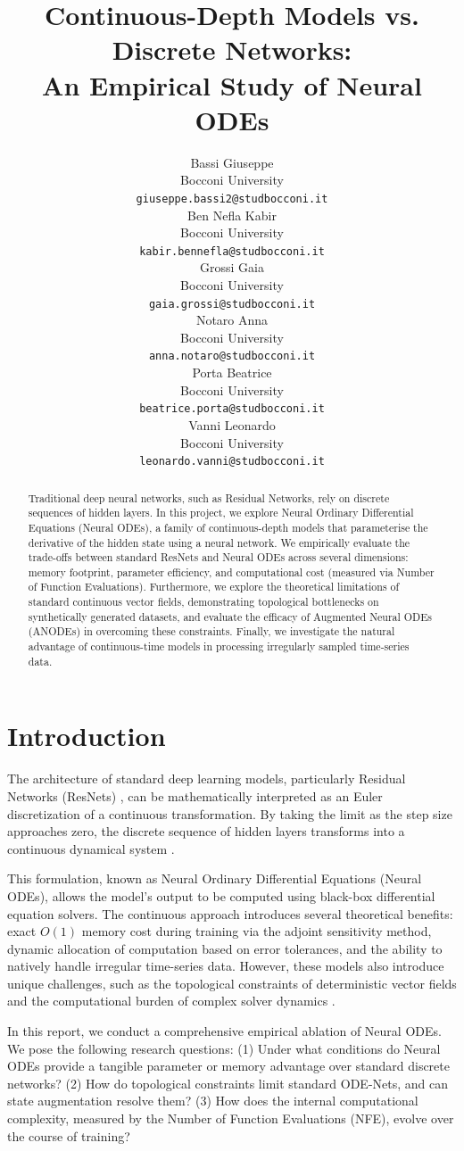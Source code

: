\documentclass{article}
\title{Continuous-Depth Models vs. Discrete Networks: \\ An Empirical Study of Neural ODEs}
\author{
  Bassi Giuseppe \\
  Bocconi University \\
  \texttt{giuseppe.bassi2@studbocconi.it} \\
  \And
  Ben Nefla Kabir \\
  Bocconi University \\
  \texttt{kabir.bennefla@studbocconi.it} \\
  \And
  Grossi Gaia \\
  Bocconi University \\
  \texttt{gaia.grossi@studbocconi.it} \\
  \AND
  Notaro Anna \\
  Bocconi University \\
  \texttt{anna.notaro@studbocconi.it} \\
  \And
  Porta Beatrice \\
  Bocconi University \\
  \texttt{beatrice.porta@studbocconi.it} \\
  \And
  Vanni Leonardo \\
Bocconi University \\
  \texttt{leonardo.vanni@studbocconi.it} \\
}
\begin{document}
\maketitle

\begin{abstract}
Traditional deep neural networks, such as Residual Networks, rely on discrete sequences of hidden layers. In this project, we explore Neural Ordinary Differential Equations (Neural ODEs), a family of continuous-depth models that parameterise the derivative of the hidden state using a neural network. We empirically evaluate the trade-offs between standard ResNets and Neural ODEs across several dimensions: memory footprint, parameter efficiency, and computational cost (measured via Number of Function Evaluations). Furthermore, we explore the theoretical limitations of standard continuous vector fields, demonstrating topological bottlenecks on synthetically generated datasets, and evaluate the efficacy of Augmented Neural ODEs (ANODEs) in overcoming these constraints. Finally, we investigate the natural advantage of continuous-time models in processing irregularly sampled time-series data. 
\end{abstract}

\section{Introduction}

The architecture of standard deep learning models, particularly Residual Networks (ResNets) \cite{he2016deep}, can be mathematically interpreted as an Euler discretization of a continuous transformation. By taking the limit as the step size approaches zero, the discrete sequence of hidden layers transforms into a continuous dynamical system \cite{chen2018neural}. 

This formulation, known as Neural Ordinary Differential Equations (Neural ODEs), allows the model's output to be computed using black-box differential equation solvers. The continuous approach introduces several theoretical benefits: exact $O(1)$ memory cost during training via the adjoint sensitivity method, dynamic allocation of computation based on error tolerances, and the ability to natively handle irregular time-series data. However, these models also introduce unique challenges, such as the topological constraints of deterministic vector fields and the computational burden of complex solver dynamics \cite{dupont2019augmented}. 

In this report, we conduct a comprehensive empirical ablation of Neural ODEs. We pose the following research questions: (1) Under what conditions do Neural ODEs provide a tangible parameter or memory advantage over standard discrete networks? (2) How do topological constraints limit standard ODE-Nets, and can state augmentation resolve them? (3) How does the internal computational complexity, measured by the Number of Function Evaluations (NFE), evolve over the course of training?
\end{document}
